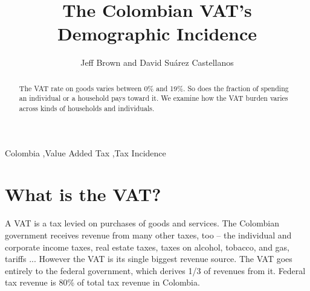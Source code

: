 \documentclass[preprint,12pt]{elsarticle}
\begin{document}
\begin{frontmatter}


\title{The Colombian VAT's Demographic Incidence}




\author{Jeff Brown and David Suárez Castellanos}

\address{Observatorio Fiscal
  \\ Pontificia Universidad Javeriana
  \\ Bogotá, Colombia}

\begin{abstract}
The VAT rate on goods varies between 0\% and 19\%. So does the fraction of spending an individual or a household pays toward it. We examine how the VAT burden varies across kinds of households and individuals.
\end{abstract}

\begin{keyword}
Colombia \sep Value Added Tax \sep Tax Incidence
\end{keyword}

\end{frontmatter}


\section{What is the VAT?}

A VAT is a tax levied on purchases of goods and services. The Colombian government receives revenue from many other taxes, too -- the individual and corporate income taxes, real estate taxes, taxes on alcohol, tobacco, and gas, tariffs ... However the VAT is its single biggest revenue source. The VAT goes entirely to the federal government, which derives 1/3 of revenues from it. Federal tax revenue is 80\% of total tax revenue in Colombia.
\\
\end{document}
